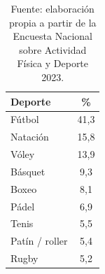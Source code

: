\begin{table}[H]
\centering
\caption{Deportes practicados en Argentina según ENAFYD 2023}
\label{tab:deportes-practicados}
\begin{tabular}{lc}
\toprule
\textbf{Deporte} & \textbf{\%} \\
\midrule
Fútbol & 41,3 \\
Natación & 15,8 \\
Vóley & 13,9 \\
Básquet & 9,3 \\
Boxeo & 8,1 \\
Pádel & 6,9 \\
Tenis & 5,5 \\
Patín / roller & 5,4 \\
Rugby & 5,2 \\
\bottomrule
\end{tabular}
\caption*{Fuente: elaboración propia a partir de la Encuesta Nacional sobre Actividad Física y Deporte 2023.}
\end{table}